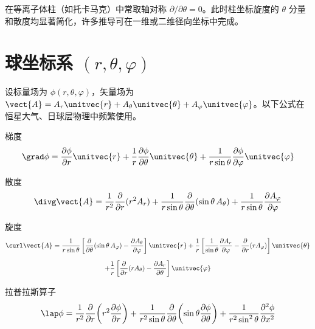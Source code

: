 \begin{insight}[轴对称假设下的简化]
在等离子体柱（如托卡马克）中常取轴对称 $\partial/\partial\theta=0$。此时柱坐标旋度的 $\theta$ 分量和散度均显著简化，许多推导可在一维或二维径向坐标中完成。
\end{insight}


\section{球坐标系 $(r,\theta,\varphi)$}

设标量场为 $\phi(r,\theta,\varphi)$，矢量场为 $\vect{A}=A_r\unitvec{r}+A_\theta\unitvec{\theta}+A_\varphi\unitvec{\varphi}$。以下公式在恒星大气、日球层物理中频繁使用。

\begin{definition}{梯度}{}
\begin{equation}
\grad\phi = \frac{\partial \phi}{\partial r}\unitvec{r}
+ \frac{1}{r}\frac{\partial \phi}{\partial \theta}\unitvec{\theta}
+ \frac{1}{r\sin\theta}\frac{\partial \phi}{\partial \varphi}\unitvec{\varphi}
\end{equation}
\end{definition}

\begin{definition}{散度}{}
\begin{equation}
\divg\vect{A} = \frac{1}{r^2}\frac{\partial }{\partial r}(r^2A_r)
+ \frac{1}{r\sin\theta}\frac{\partial }{\partial \theta}(\sin\theta\,A_\theta)
+ \frac{1}{r\sin\theta}\frac{\partial A_\varphi}{\partial \varphi}
\end{equation}
\end{definition}

\begin{definition}{旋度}{}
\begin{multline}
\curl\vect{A} =
\frac{1}{r\sin\theta}\left[\frac{\partial }{\partial \theta}(\sin\theta\,A_\varphi)-\frac{\partial A_\theta}{\partial \varphi}\right]\unitvec{r}
+ \frac{1}{r}\left[\frac{1}{\sin\theta}\frac{\partial A_r}{\partial \varphi}-\frac{\partial }{\partial r}(rA_\varphi)\right]\unitvec{\theta} \\[6pt]
+ \frac{1}{r}\left[\frac{\partial }{\partial r}(rA_\theta)-\frac{\partial A_r}{\partial \theta}\right]\unitvec{\varphi}
\end{multline}
\end{definition}

\begin{definition}{拉普拉斯算子}{}
\begin{equation}
\lap\phi = \frac{1}{r^2}\frac{\partial }{\partial r}\!\left(r^2\frac{\partial \phi}{\partial r}\right)
+ \frac{1}{r^2\sin\theta}\frac{\partial }{\partial \theta}\!\left(\sin\theta\frac{\partial \phi}{\partial \theta}\right)
+ \frac{1}{r^2\sin^2\theta}\frac{\partial^2 \phi}{\partial x^2}
\end{equation}
\end{definition}


